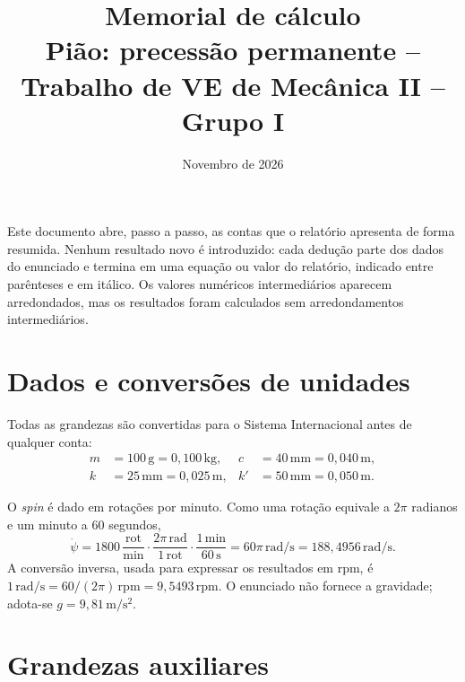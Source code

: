 \documentclass[11pt,a4paper]{article}
\title{\textbf{Memorial de cálculo}\\[0.2cm]\large Pião: precessão permanente -- Trabalho de VE de Mecânica II -- Grupo I}
\author{}
\date{Novembro de 2026}
\newcommand{\un}[1]{\,\mathrm{#1}}
\newcommand{\psid}{\dot{\psi}}
\begin{document}
\maketitle
\vspace{-1cm}

\noindent Este documento abre, passo a passo, as contas que o relatório apresenta de forma resumida. Nenhum resultado novo é introduzido: cada dedução parte dos dados do enunciado e termina em uma equação ou valor do relatório, indicado entre parênteses e em itálico. Os valores numéricos intermediários aparecem arredondados, mas os resultados foram calculados sem arredondamentos intermediários.

\tableofcontents

\section{Dados e conversões de unidades}

Todas as grandezas são convertidas para o Sistema Internacional antes de qualquer conta:
\begin{align}
m &= 100\un{g} = 0,100\un{kg}, & c &= 40\un{mm} = 0,040\un{m},\\
k &= 25\un{mm} = 0,025\un{m}, & k' &= 50\un{mm} = 0,050\un{m}.
\end{align}

O \textit{spin} é dado em rotações por minuto. Como uma rotação equivale a $2\pi$ radianos e um minuto a $60$ segundos,
\begin{equation}
\psid = 1800\,\frac{\mathrm{rot}}{\mathrm{min}}\cdot\frac{2\pi\un{rad}}{1\un{rot}}\cdot\frac{1\un{min}}{60\un{s}} = 60\pi\un{rad/s} = 188,4956\un{rad/s}.
\end{equation}
A conversão inversa, usada para expressar os resultados em rpm, é $1\un{rad/s}=60/(2\pi)\un{rpm}=9,5493\un{rpm}$. O enunciado não fornece a gravidade; adota-se $g=9,81\un{m/s^2}$.

\section{Grandezas auxiliares}
\end{document}
